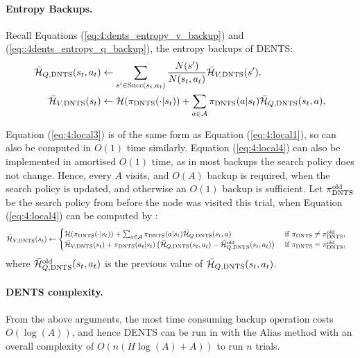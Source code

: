         \paragraph{Entropy Backups.} Recall Equations (\ref{eq:4:dents_entropy_v_backup}) and (\ref{eq::4dents_entropy_q_backup}), the entropy backups of DENTS:
        \begin{align}
            {\bar{\mathcal{H}}_{Q,{\textnormal{DNTS}}}}(s_t,a_t) &\leftarrow \sum_{s'\in {\textnormal{Succ}(s_t,a_t)}} \frac{N(s')}{N(s_t,a_t)} {\bar{\mathcal{H}}_{V,{\textnormal{DNTS}}}}(s'). 
                \label{eq:4:local3} \\
            {\bar{\mathcal{H}}_{V,{\textnormal{DNTS}}}}(s_t) &\leftarrow \mathcal{H}({\pi_{{\textnormal{DNTS}}}}(\cdot | s_t)) + \sum_{a\in\mathcal{A}} {\pi_{{\textnormal{DNTS}}}}(a|s_t){\bar{\mathcal{H}}_{Q,{\textnormal{DNTS}}}}(s_t,a), 
                \label{eq:4:local4} 
        \end{align}


        \newcommand{\pidentsold}{{\pi_{\dents}^{\old}}}   
        \newcommand{\HQdentsold}{{\bar{\cl{H}}^{\old}_{Q,\dents}}}

        Equation (\ref{eq:4:local3}) is of the same form as Equation (\ref{eq:4:local1}), so can also be computed in $O(1)$ time similarly. Equation (\ref{eq:4:local4}) can also be implemented in amortised $O(1)$ time, as in most backups the search policy does not change. Hence, every $A$ visits, and $O(A)$ backup is required, when the search policy is updated, and otherwise an $O(1)$ backup is sufficient. Let $\pidentsold$ be the search policy from before the node was visited this trial, when Equation (\ref{eq:4:local4}) can be computed by :
        \begin{align}
            \HVdents(s_t) &\leftarrow \begin{cases}
                \cl{H}(\pidents(\cdot | s_t)) + \sum_{a\in\cl{A}} \pidents(a|s_t)\HQdents(s_t,a)
                    & \text{ if } \pidents \neq \pidentsold, \\
                \HVdents(s_t) + \pidents(a_t|s_t)\left( \HQdents(s_t,a_t) - \HQdentsold(s_t,a_t) \right)
                    & \text{ if } \pidents = \pidentsold,
            \end{cases} 
        \end{align}
        where $\HQdentsold(s_t,a_t)$ is the previous value of ${\bar{\mathcal{H}}_{Q,{\textnormal{DNTS}}}}(s_t,a_t)$. 

        \paragraph{DENTS complexity.} From the above arguments, the most time consuming backup operation costs $O(\log(A))$, and hence DENTS can be run in \mctsmode\ewe with the Alias method with an overall complexity of $O(n(H\log(A)+A))$ to run $n$ trials.
        
